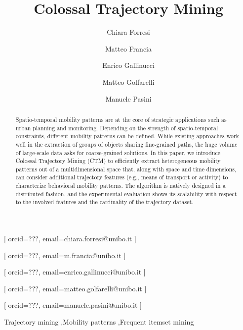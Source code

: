 \documentclass[
]{ceurart}
\begin{document}
\sloppy
{}

\title{Colossal Trajectory Mining}
\author[1]{Chiara Forresi}[
orcid=???,
email=chiara.forresi@unibo.it
]
\address[1]{DISI --- University of Bologna, Cesena, Italy}
\author[1]{Matteo Francia}[%
orcid=???,
email=m.francia@unibo.it
]
\cormark[1]
\author[1]{Enrico Gallinucci}[%
orcid=???,
email=enrico.gallinucci@unibo.it
]
\author[1]{Matteo Golfarelli}[%
orcid=???,
email=matteo.golfarelli@unibo.it
]
\author[1]{Manuele Pasini}[%
orcid=???,
email=manuele.pasini@unibo.it
]

\begin{abstract}
Spatio-temporal mobility patterns are at the core of strategic applications such as urban planning and monitoring.
Depending on the strength of spatio-temporal constraints, different mobility patterns can be defined. 
While existing approaches work well in the extraction of groups of objects sharing fine-grained paths, the huge volume of large-scale data asks for coarse-grained solutions.
In this paper, we introduce Colossal Trajectory Mining (CTM) to efficiently extract heterogeneous mobility patterns out of a multidimensional space that, along with space and time dimensions, can consider additional trajectory features (e.g., means of transport or activity) to characterize behavioral mobility patterns. 
The algorithm is natively designed in a distributed fashion, and the experimental evaluation shows its scalability with respect to the involved features and the cardinality of the trajectory dataset.
\end{abstract}

\begin{keywords}
Trajectory mining \sep Mobility patterns \sep Frequent itemset mining
\end{keywords}

\maketitle
\end{document}
